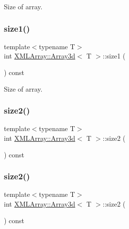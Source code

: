 Size of array. 

\mbox{\label{classXMLArray_1_1Array3d_aa084cbb2756e62556c9ec4c4cb971bf0}} 
\subsubsection{\texorpdfstring{size1()}{size1()}\hspace{0.1cm}{\footnotesize\ttfamily [3/3]}}
{\footnotesize\ttfamily template$<$typename T$>$ \\
int \mbox{\hyperlink{classXMLArray_1_1Array3d}{X\+M\+L\+Array\+::\+Array3d}}$<$ T $>$\+::size1 (\begin{DoxyParamCaption}{ }\end{DoxyParamCaption}) const\hspace{0.3cm}{\ttfamily [inline]}}



Size of array. 

\mbox{\label{classXMLArray_1_1Array3d_a1ea00a28e916b3fd9102ce7057c02dac}} 
\subsubsection{\texorpdfstring{size2()}{size2()}\hspace{0.1cm}{\footnotesize\ttfamily [1/3]}}
{\footnotesize\ttfamily template$<$typename T$>$ \\
int \mbox{\hyperlink{classXMLArray_1_1Array3d}{X\+M\+L\+Array\+::\+Array3d}}$<$ T $>$\+::size2 (\begin{DoxyParamCaption}{ }\end{DoxyParamCaption}) const\hspace{0.3cm}{\ttfamily [inline]}}

\mbox{\label{classXMLArray_1_1Array3d_a1ea00a28e916b3fd9102ce7057c02dac}} 
\subsubsection{\texorpdfstring{size2()}{size2()}\hspace{0.1cm}{\footnotesize\ttfamily [2/3]}}
{\footnotesize\ttfamily template$<$typename T$>$ \\
int \mbox{\hyperlink{classXMLArray_1_1Array3d}{X\+M\+L\+Array\+::\+Array3d}}$<$ T $>$\+::size2 (\begin{DoxyParamCaption}{ }\end{DoxyParamCaption}) const\hspace{0.3cm}{\ttfamily [inline]}}

